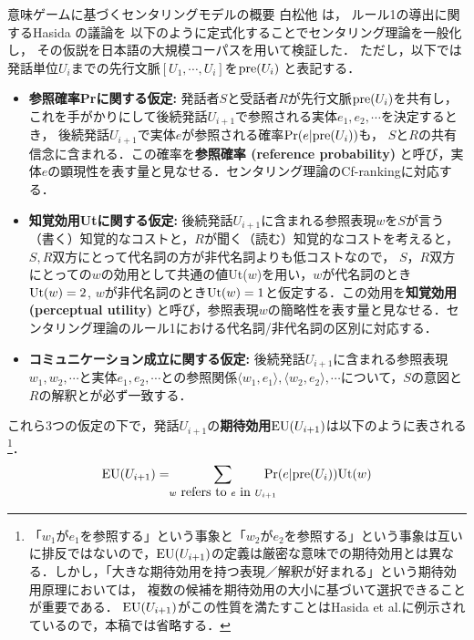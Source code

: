 \documentclass[japanese]{jnlp_1.3e}
\renewcommand{\paragraph}{}
\begin{document}
\paragraph{意味ゲームに基づくセンタリングモデルの概要} 
白松他 \citeyear{siramatu2005nlp}は，
ルール1の導出に関するHasida の議論を
以下のように定式化することでセンタリング理論を一般化し，
その仮説を日本語の大規模コーパスを用いて検証した．
ただし，以下では発話単位$U_i$までの先行文脈$[U_1,\cdots,U_i]$を${\rm pre}(U_i)$ と表記する．
\begin{itemize}
\item {\bf 参照確率Prに関する仮定: } 発話者$S$と受話者$R$が先行文脈${\rm pre}(U_i)$を共有し，
これを手がかりにして後続発話$U_{i+1}$で参照される実体$e_1, e_2, \cdots$を決定するとき，
後続発話$U_{i+1}$で実体$e$が参照される確率${\rm Pr}(e|{\rm pre}(U_i))$も，
$S$と$R$の共有信念に含まれる．この確率を{\bf 参照確率 (reference probability)} と呼び，実体$e$の顕現性を表す量と見なせる．センタリング理論のCf-rankingに対応する．
\item {\bf 知覚効用Utに関する仮定: } 後続発話$U_{i+1}$に含まれる参照表現$w$を$S$が言う（書く）知覚的なコストと，$R$が聞く（読む）知覚的なコストを考えると，$S, R$双方にとって代名詞の方が非代名詞よりも低コストなので，
$S$，$R$双方にとっての$w$の効用として共通の値Ut($w$)を用い，$w$が代名詞のとき${\rm Ut}(w)=2$, $w$が非代名詞のとき${\rm Ut}(w)=1$と仮定する．この効用を{\bf 知覚効用 (perceptual utility)} と呼び，参照表現$w$の簡略性を表す量と見なせる．センタリング理論のルール1における代名詞/非代名詞の区別に対応する．
\item {\bf コミュニケーション成立に関する仮定: } 後続発話$U_{i+1}$に含まれる参照表現$w_1, w_2, \cdots$と実体$e_1, e_2, \cdots$との参照関係$\langle w_1, e_1 \rangle, \langle w_2, e_2 \rangle, \cdots$について，$S$の意図と$R$の解釈とが必ず一致する．
\end{itemize}
\noindent
これら3つの仮定の下で，発話$U_{i+1}$の{\bf 期待効用}${\rm EU}(U_{i+1})$は以下のように表される\footnote{
	「$w_1$が$e_1$を参照する」という事象と「$w_2$が$e_2$を参照する」という事象は互いに排反ではないので，${\rm EU}(U_{i+1})$の定義は厳密な意味での期待効用とは異なる．しかし，「大きな期待効用を持つ表現／解釈が好まれる」という期待効用原理においては，
複数の候補を期待効用の大小に基づいて選択できることが重要である．
${\rm EU}(U_{i+1})$がこの性質を満たすことはHasida et al.\citeyear{hasida1995}に例示されているので，本稿では省略する．}．
$${\rm EU}(U_{i+1})=\hspace{-1mm}\sum_{w\mbox{ refers to }e\mbox{ in }U_{i+1}}\hspace{-4mm}{\rm Pr}(e|{\rm pre}(U_i)){\rm Ut}(w)$$
\end{document}
